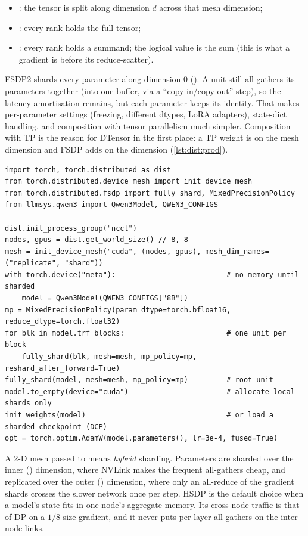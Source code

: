 \begin{itemize}
  \item {}: the tensor is split along dimension $d$ across that mesh dimension;
  \item {}: every rank holds the full tensor;
  \item {}: every rank holds a summand; the logical value is the sum (this is what a
    gradient is before its reduce-scatter).
\end{itemize}

FSDP2 shards every parameter along dimension 0 (). A unit still all-gathers its
parameters together (into one buffer, via a ``copy-in/copy-out'' step), so the latency
amortisation remains, but each parameter keeps its identity. That makes per-parameter settings
(freezing, different dtypes, LoRA adapters), state-dict handling, and composition with tensor
parallelism much simpler. Composition with TP is the reason for DTensor in the first place: a TP
weight is  on the  mesh dimension and FSDP adds  on the
 dimension (\cref{lst:dist:prod}).

\begin{lstlisting}[caption={FSDP2 on our Qwen3 model with hybrid sharding (HSDP): shard inside a node, replicate across nodes.},label={lst:sharding:fsdp2}]
import torch, torch.distributed as dist
from torch.distributed.device_mesh import init_device_mesh
from torch.distributed.fsdp import fully_shard, MixedPrecisionPolicy
from llmsys.qwen3 import Qwen3Model, QWEN3_CONFIGS

dist.init_process_group("nccl")
nodes, gpus = dist.get_world_size() // 8, 8
mesh = init_device_mesh("cuda", (nodes, gpus), mesh_dim_names=("replicate", "shard"))
with torch.device("meta"):                          # no memory until sharded
    model = Qwen3Model(QWEN3_CONFIGS["8B"])
mp = MixedPrecisionPolicy(param_dtype=torch.bfloat16, reduce_dtype=torch.float32)
for blk in model.trf_blocks:                        # one unit per block
    fully_shard(blk, mesh=mesh, mp_policy=mp, reshard_after_forward=True)
fully_shard(model, mesh=mesh, mp_policy=mp)         # root unit
model.to_empty(device="cuda")                       # allocate local shards only
init_weights(model)                                 # or load a sharded checkpoint (DCP)
opt = torch.optim.AdamW(model.parameters(), lr=3e-4, fused=True)
\end{lstlisting}

A 2-D mesh passed to  means \emph{hybrid} sharding. Parameters are sharded
over the inner () dimension, where NVLink makes the frequent all-gathers cheap, and
replicated over the outer () dimension, where only an all-reduce of the gradient
shards crosses the slower network once per step. HSDP is the default choice when a model's state
fits in one node's aggregate memory. Its cross-node traffic is that of DP on a $1/8$-size
gradient, and it never puts per-layer all-gathers on the inter-node links.

